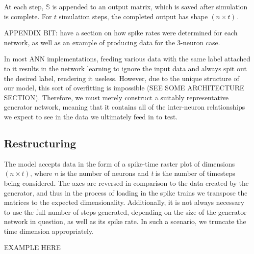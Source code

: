 At each step, $\mathbb{S}$ is appended to an output matrix, which is saved after 
simulation is complete. For $t$ simulation steps, the completed output has shape 
$(n \times t)$.

APPENDIX BIT: have a section on how spike rates were determined for each 
network, as well as an example of producing data for the 3-neuron case.

In most ANN implementations, feeding various data with the same label attached 
to it results in the network learning to ignore the input data and always spit 
out the desired label, rendering it useless. However, due to the unique 
structure of our model, this sort of overfitting is impossible (SEE SOME 
ARCHITECTURE SECTION). Therefore, we must merely construct a suitably 
representative generator network, meaning that it contains all of the 
inter-neuron relationships we expect to see in the data we ultimately feed in to 
test.

\subsection{Restructuring}
The model accepts data in the form of a spike-time raster plot of dimensions $(n 
\times t)$, where \textit{n} is the number of neurons and \textit{t} is the 
number of timesteps being considered. The axes are reversed in comparison to the 
data created by the generator, and thus in the process of loading in the spike 
trains we transpose the matrices to the expected dimensionality. Additionally, 
it is not always necessary to use the full number of steps generated, depending 
on the size of the generator network in question, as well as its spike rate. In 
such a scenario, we truncate the time dimension appropriately.

EXAMPLE HERE
